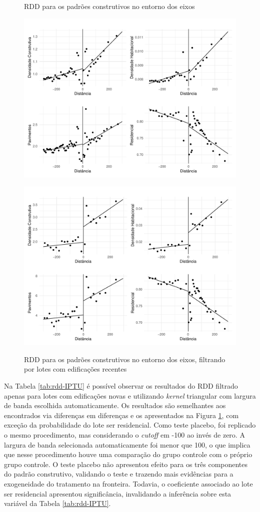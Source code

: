 \begin{figure}[!h]
    \centering

    \caption{RDD para os padrões construtivos no entorno dos eixos}
    \includegraphics[width = .9\textwidth]{figuras/rdd-plot-IPTU.pdf}
    \label{fig:rdd-IPTU}

    \caption{RDD para os padrões construtivos no entorno dos eixos, filtrando por lotes com edificações recentes}
    \includegraphics[width = .9\textwidth]{figuras/rdd-plot-IPTU-posPDE.pdf}
    \label{fig:rdd-IPTU-posPDE}
\end{figure}


Na Tabela \ref{tab:rdd-IPTU} é possível observar os resultados do RDD filtrado apenas para lotes com edificações novas e utilizando \textit{kernel} triangular com largura de banda escolhida automaticamente. Os resultados são semelhantes aos encontrados via diferenças em diferenças e os apresentados na Figura \ref{fig:rdd-IPTU-posPDE}, com exceção da probabilidade do lote ser residencial. Como teste placebo, foi replicado o mesmo procedimento, mas considerando o \textit{cutoff} em -100 ao invés de zero. A largura de banda selecionada automaticamente foi menor que 100, o que implica que nesse procedimento houve uma comparação do grupo controle com o próprio grupo controle. O teste placebo não apresentou efeito para os três componentes do padrão construtivo, validando o teste e trazendo mais evidências para a exogeneidade do tratamento na fronteira. Todavia, o coeficiente associado ao lote ser residencial apresentou significância, invalidando a inferência sobre esta variável da Tabela \ref{tab:rdd-IPTU}.


